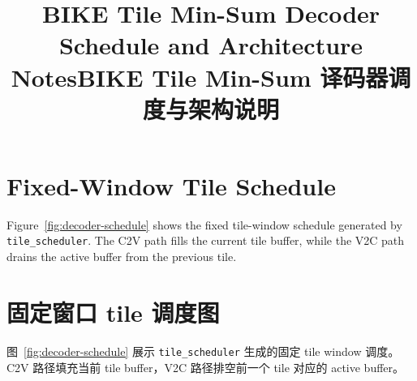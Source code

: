 \documentclass{article}
\title{BIKE Tile Min-Sum Decoder Schedule and Architecture Notes}
\title{BIKE Tile Min-Sum 译码器调度与架构说明}
\author{}
\date{}
\begin{document}
\maketitle

\ifPDFTeX
\section{Fixed-Window Tile Schedule}

Figure~\ref{fig:decoder-schedule} shows the fixed tile-window schedule generated
by \texttt{tile\_scheduler}. The C2V path fills the current tile buffer, while
the V2C path drains the active buffer from the previous tile.
\else
\section{固定窗口 tile 调度图}

图~\ref{fig:decoder-schedule} 展示 \texttt{tile\_scheduler} 生成的固定 tile window 调度。
C2V 路径填充当前 tile buffer，V2C 路径排空前一个 tile 对应的 active buffer。
\fi
\end{document}
